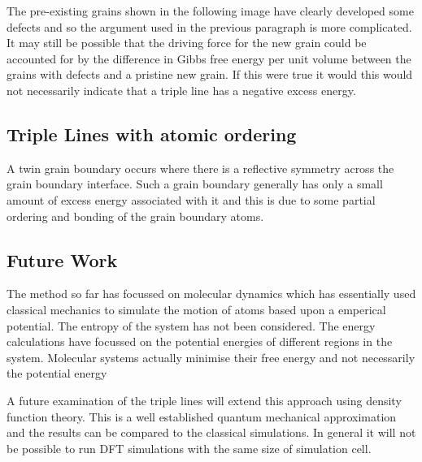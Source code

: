 \documentclass[12pt,a4paper]{book}
\begin{document}
The pre-existing grains shown in the following image have clearly developed some defects and so the argument used in the previous paragraph is more complicated. It may still be possible that the driving force for the new grain could be accounted for by the difference in Gibbs free energy per unit volume between the grains with defects and a pristine new grain. If this were true it would this would not necessarily indicate that a triple line has a negative excess energy.


\subsection{Triple Lines with atomic ordering}

A twin grain boundary occurs where there is a reflective symmetry across the grain boundary interface. Such a grain boundary generally has only a small amount of excess energy associated with it and this is due to some partial ordering and bonding of the grain boundary atoms.

\subsection{Future Work}

The method so far has focussed on molecular dynamics which has essentially used classical mechanics to simulate the motion of atoms based upon a emperical potential. The entropy of the system has not been considered. The energy calculations have focussed on the potential energies of different regions in the system. Molecular systems actually minimise their free energy and not necessarily the potential energy 

A future examination of the triple lines will extend this approach using density function theory. This is a well established quantum mechanical approximation and the results can be compared to the classical simulations. In general it will not be possible to run DFT simulations with the same size of simulation cell.  

 
\end{document}
